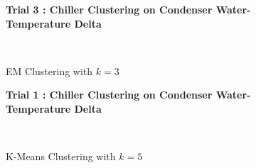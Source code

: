 \begin{figure}[!h]
\centerline{\bfseries\Large Trial 3 : Chiller Clustering on Condenser Water-Temperature Delta}\\
\caption{EM Clustering with $k=3$}
\end{figure}
\begin{figure}[!h]
\centerline{\bfseries\Large Trial 1 : Chiller Clustering on Condenser Water-Temperature Delta}\\
\caption{K-Means Clustering with $k=5$}
\end{figure}
